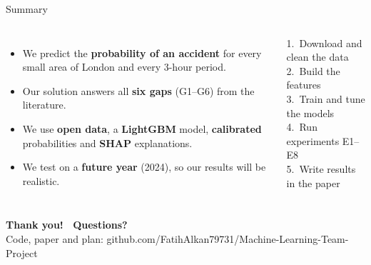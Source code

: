 \documentclass[aspectratio=169,11pt,t]{beamer}
\newcommand{\pname}{}
\newcommand{\ppart}{0}
\newcommand{\presenter}[3]{%
  \colorlet{pc}{#1}\renewcommand{\ppart}{#2}\renewcommand{\pname}{#3}}
\begin{document}
\presenter{p1}{0}{}
\begin{frame}{Summary}
\begin{columns}[T,onlytextwidth]
\begin{itemize}
  \item We predict the \textbf{probability of an accident} for every small area of London
        and every 3-hour period.
  \item Our solution answers all \textbf{six gaps} (G1--G6) from the literature.
  \item We use \textbf{open data}, a \textbf{LightGBM} model, \textbf{calibrated} probabilities
        and \textbf{SHAP} explanations.
  \item We test on a \textbf{future year} (2024), so our results will be realistic.
\end{itemize}
\begin{keybox}[title=Next steps]
\small
1.\ Download and clean the data\\
2.\ Build the features\\
3.\ Train and tune the models\\
4.\ Run experiments E1--E8\\
5.\ Write results in the paper
\end{keybox}
\end{columns}
\vspace{4mm}
\begin{center}
{\Large\bfseries Thank you! \ Questions?}\\[4pt]
{\scriptsize\color{black!60} Code, paper and plan: github.com/FatihAlkan79731/Machine-Learning-Team-Project}
\end{center}
\end{frame}
\end{document}
